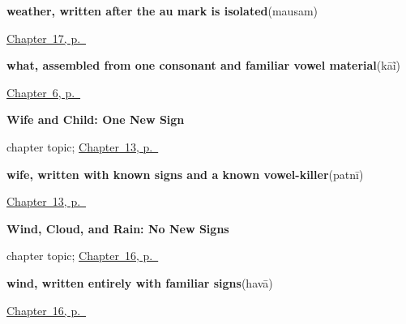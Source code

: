 \noindent\begin{minipage}[t]{\linewidth}
\raggedright
\textbf{weather, written after the au mark is isolated}\enspace\emph{}\enspace(mausam)\par
\footnotesize \hyperref[ch:mw-weather-six]{Chapter~17, p.~\pageref*{ch:mw-weather-six}}
\end{minipage}\par\smallskip

\noindent\begin{minipage}[t]{\linewidth}
\raggedright
\textbf{what, assembled from one consonant and familiar vowel material}\enspace\emph{}\enspace(kāĩ)\par
\footnotesize \hyperref[ch:mw-name-question]{Chapter~6, p.~\pageref*{ch:mw-name-question}}
\end{minipage}\par\smallskip

\noindent\begin{minipage}[t]{\linewidth}
\raggedright
\textbf{Wife and Child: One New Sign}\par
\footnotesize chapter topic; \hyperref[ch:mw-family-twelve]{Chapter~13, p.~\pageref*{ch:mw-family-twelve}}
\end{minipage}\par\smallskip

\noindent\begin{minipage}[t]{\linewidth}
\raggedright
\textbf{wife, written with known signs and a known vowel-killer}\enspace\emph{}\enspace(patnī)\par
\footnotesize \hyperref[ch:mw-family-twelve]{Chapter~13, p.~\pageref*{ch:mw-family-twelve}}
\end{minipage}\par\smallskip

\noindent\begin{minipage}[t]{\linewidth}
\raggedright
\textbf{Wind, Cloud, and Rain: No New Signs}\par
\footnotesize chapter topic; \hyperref[ch:mw-weather-three]{Chapter~16, p.~\pageref*{ch:mw-weather-three}}
\end{minipage}\par\smallskip

\noindent\begin{minipage}[t]{\linewidth}
\raggedright
\textbf{wind, written entirely with familiar signs}\enspace\emph{}\enspace(havā)\par
\footnotesize \hyperref[ch:mw-weather-three]{Chapter~16, p.~\pageref*{ch:mw-weather-three}}
\end{minipage}\par\smallskip

